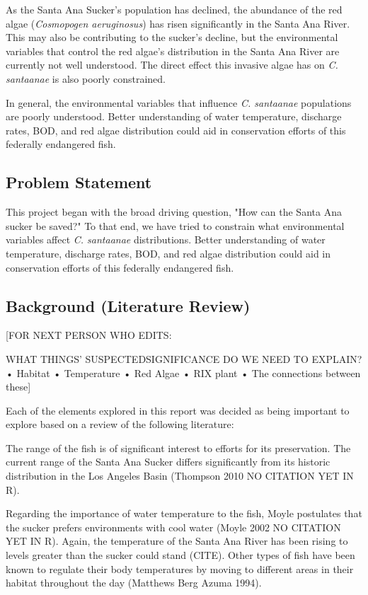 \documentclass{article}
\begin{document}
As the Santa Ana Sucker's population has declined, the abundance of the red algae (\emph{Cosmopogen aeruginosus}) has risen significantly in the Santa Ana River. This may also be contributing to the sucker's decline, but the environmental variables that control the red algae's distribution in the Santa Ana River are currently not well understood. The direct effect this invasive algae has on \emph{C. santaanae} is also poorly constrained. 

In general, the environmental variables that influence \emph{C. santaanae} populations are poorly understood. Better understanding of water temperature, discharge rates, BOD, and red algae distribution could aid in conservation efforts of this federally endangered fish. 


\subsection{Problem Statement}


This project began with the broad driving question, "How can the Santa Ana sucker be saved?" To that end, we have tried to constrain what environmental variables affect \emph{C. santaanae} distributions. Better understanding of water temperature, discharge rates, BOD, and red algae distribution could aid in conservation efforts of this federally endangered fish.

\subsection{Background (Literature Review)}

[FOR NEXT PERSON WHO EDITS: 

WHAT THINGS' SUSPECTEDSIGNIFICANCE DO WE NEED TO EXPLAIN? 
•	Habitat 
•	Temperature 
•	Red Algae
•	RIX plant
•	The connections between these]


Each of the elements explored in this report was decided as being important to explore based on a review of the following literature:

The range of the fish is of significant interest to efforts for its preservation. The current range of the Santa Ana Sucker differs significantly from its historic distribution in the Los Angeles Basin (Thompson 2010 NO CITATION YET IN R).

Regarding the importance of water temperature to the fish, Moyle postulates that the sucker prefers environments with cool water (Moyle 2002 NO CITATION YET IN R). Again, the temperature of the Santa Ana River has been rising to levels greater than the sucker could stand (CITE). Other types of fish have been known to regulate their body temperatures by moving to different areas in their habitat throughout the day (Matthews Berg Azuma 1994).
\end{document}

